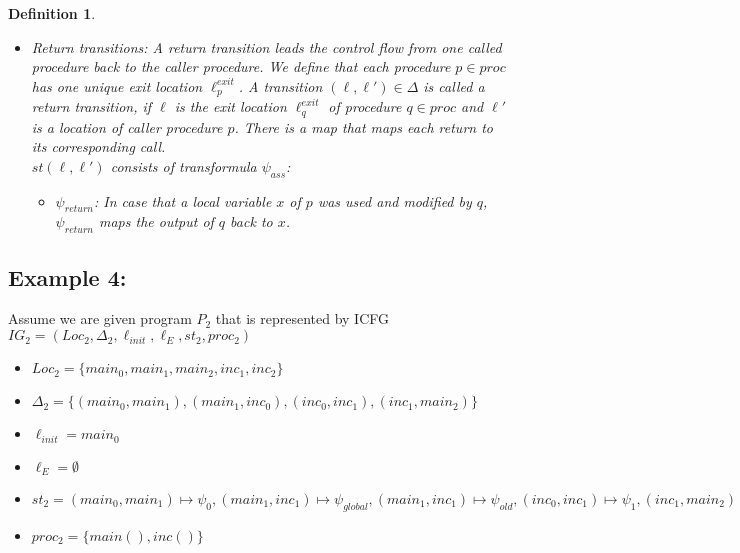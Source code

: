 \documentclass{article}
\newtheorem{mydef}{Definition}
\begin{document}
\begin{mydef}
\begin{itemize}
			\item Return transitions: A return transition leads the control flow from one called procedure back to the caller procedure. We define that each procedure $p \in proc$ has one unique exit location $\ell^{exit}_p$. A transition $(\ell, \ell') \in \Delta$ is called a return transition, if $\ell$ is the exit location $\ell_q^{exit}$ of procedure $q \in proc$ and $\ell'$ is a location of caller procedure $p$. There is a map that maps each return to its corresponding call. \\
			$st(\ell, \ell')$ consists of transformula $\psi_{ass}$:
			\begin{itemize}
				\item $\psi_{return}$: In case that a local variable $x$ of $p$ was used and modified by $q$, $\psi_{return}$ maps the output of $q$ back to $x$.
			\end{itemize}
		\end{itemize}
	\end{mydef}
	
	\subsection*{Example 4:}
	Assume we are given program $P_2$ that is represented by ICFG $IG_2 = (Loc_2, \Delta_2, \ell_{init}, \ell_E, st_2, proc_2)$
	\begin{itemize}
		\item  $Loc_2= \{ main_0, main_1,  main_2, inc_1, inc_2 \} $
		\item $\Delta_2 = \{ (main_0, main_1), ( main_1, inc_0), (inc_0, inc_1), (inc_1, main_2)\}$
		\item $\ell_{init} = main_0$ 
		\item $\ell_E = \emptyset$
		\item $st_2 = (main_0, main_1) \mapsto \psi_0, (main_1, inc_1) \mapsto \psi_{global}, (main_1, inc_1) \mapsto \psi_{old}, (inc_0, inc_1) \mapsto \psi_1,  (inc_1, main_2) \mapsto \psi_{return})$
		\item $proc_2 = \{ main(), inc()\}$
	\end{itemize} 
	\bigskip
	
\end{document}
